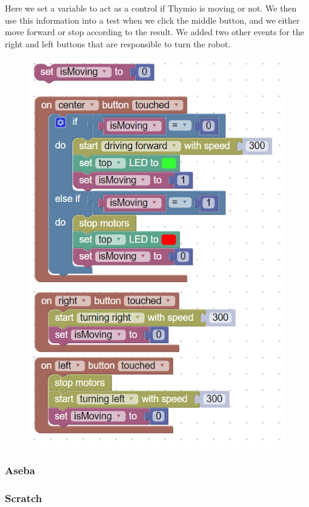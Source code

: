 \documentclass{scrartcl}
\begin{document}
Here we set a variable to act as a control if Thymio is moving or not. We then use this information into a test when we click the middle button, and we either move forward or stop according to the result. 
We added two other events for the right and left buttons that are responsible to turn the robot.
\begin{figure}[h!]
  \includegraphics[width=\textwidth]{./Blockly/advanced_program}
  \label{fig:thymio_blockly_advanced_program}
\end{figure}
\subsubsection{Aseba}
\subsubsection{Scratch}
\end{document}
